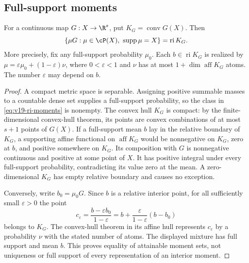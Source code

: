 \subsection{Full-support moments}
\begin{lemma}
\label{lem:v19-moment-image}
For a continuous map $G:X\to\R^s$, put $K_G=\operatorname{conv}G(X)$.
Then
\begin{equation}\label{eq:v19-ri-moments}
 \{\mu G:\mu\in\cP(X),\ \operatorname{supp}\mu=X\}
       =\operatorname{ri}K_G.
\end{equation}
More precisely, fix any full-support probability $\mu_0$. Each
$b\in\operatorname{ri}K_G$ is realized by
$\mu=\varepsilon\mu_0+(1-\varepsilon)\nu$, where $0<\varepsilon<1$
and $\nu$ has at most $1+\dim\operatorname{aff}K_G$ atoms.
The number $\varepsilon$ may depend on $b$.
\end{lemma}
\begin{proof}
A compact metric space is separable. Assigning positive summable masses
to a countable dense set supplies a full-support probability, so the
class in \eqref{eq:v19-ri-moments} is nonempty. The convex hull $K_G$
is compact: by the finite-dimensional convex-hull theorem, its points
are convex combinations of at most $s+1$ points of $G(X)$.
If a full-support mean $b$ lay in the relative boundary of $K_G$, a
supporting affine functional on $\operatorname{aff}K_G$ would be
nonnegative on $K_G$, zero at $b$, and positive somewhere on $K_G$.
Its composition with $G$ is nonnegative continuous and positive at
some point of $X$. It has positive integral under every full-support
probability, contradicting its value zero at the mean. A zero-dimensional
$K_G$ has empty relative boundary and causes no exception.

Conversely, write $b_0=\mu_0G$. Since $b$ is a relative interior point,
for all sufficiently small $\varepsilon>0$ the point
\[
 c_\varepsilon=\frac{b-\varepsilon b_0}{1-\varepsilon}
             =b+\frac{\varepsilon}{1-\varepsilon}(b-b_0)
\]
belongs to $K_G$. The convex-hull theorem in its affine hull represents
$c_\varepsilon$ by a probability $\nu$ with the stated number of atoms.
The displayed mixture has full support and mean $b$.
This proves equality of attainable moment sets, not uniqueness or
full support of every representation of an interior moment.
\end{proof}

